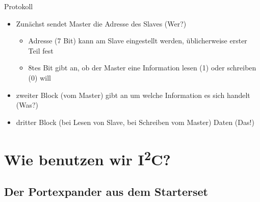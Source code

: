\documentclass{beamer}
\newcommand{\ItC}{I\textsuperscript{2}C\xspace}
\begin{document}
\begin{frame}{Protokoll}
 \begin{itemize}
   \item Zunächst sendet Master die Adresse des Slaves (Wer?)
    \begin{itemize}
      \item Adresse (7 Bit) kann am Slave eingestellt werden, üblicherweise erster Teil fest
      \item 8tes Bit gibt an, ob der Master eine Information lesen (1) oder schreiben (0) will
    \end{itemize}
   \item zweiter Block (vom Master) gibt an um welche Information es sich handelt (Was?)
   \item dritter Block (bei Lesen von Slave, bei Schreiben vom Master) Daten (Das!)
 \end{itemize}
\end{frame}

\section{Wie benutzen wir \ItC?}

\subsection{Der Portexpander aus dem Starterset}
\end{document}
